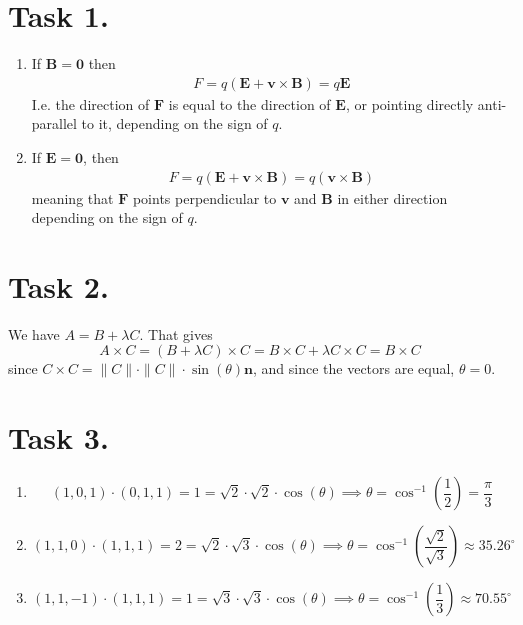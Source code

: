 \documentclass[a4paper,11pt]{article}
\begin{document}


\section*{Task 1.}
\begin{enumerate}
    \item If $\mathbf{B} = \mathbf{0}$ then 
        \begin{align*}
            F = q(\mathbf{E} + \mathbf{v} \times \mathbf{B}) = q \mathbf{E}
        \end{align*}
        I.e. the direction of $\mathbf{F}$ is equal to the direction of $\mathbf{E}$, or pointing 
        directly anti-parallel to it, depending on the sign of $q$.
    \item If $\mathbf{E} = \mathbf{0}$, then
        \begin{align*}
            F = q(\mathbf{E} + \mathbf{v} \times \mathbf{B}) = q (\mathbf{v} \times \mathbf{B})
        \end{align*}
        meaning that $\mathbf{F}$ points perpendicular to $\mathbf{v}$ and $\mathbf{B}$ in either direction
        depending on the sign of $q$.
\end{enumerate}

\section*{Task 2.}
We have $A = B + \lambda C$. That gives
\[
    A \times C = (B + \lambda C) \times C = B \times C + \lambda C \times C = B \times C
\]
since $C \times C = \|C\| \cdot \|C\| \cdot \sin(\theta) \mathbf{n}$, and since the vectors are equal, $\theta = 0$.

\section*{Task 3.}
\begin{enumerate}
    \item
        \[
            (1, 0, 1) \cdot (0, 1, 1) = 1 = \sqrt{2} \cdot \sqrt{2} \cdot \cos(\theta) \implies \theta = \cos^{-1}\left(\frac{1}{2}\right) = \frac{\pi}{3}
        \]
    \item 
        \[
            (1, 1, 0) \cdot (1, 1, 1) = 2 = \sqrt{2} \cdot \sqrt{3} \cdot \cos(\theta) \implies \theta = \cos^{-1}\left(\frac{\sqrt{2}}{\sqrt{3}}\right) \approx 35.26^{\circ}
        \]
    \item 
        \[
            (1, 1, -1) \cdot (1, 1, 1) = 1 = \sqrt{3} \cdot \sqrt{3} \cdot \cos(\theta) \implies \theta = \cos^{-1}\left(\frac{1}{3}\right) \approx 70.55^{\circ}
        \]
\end{enumerate}
\end{document}
